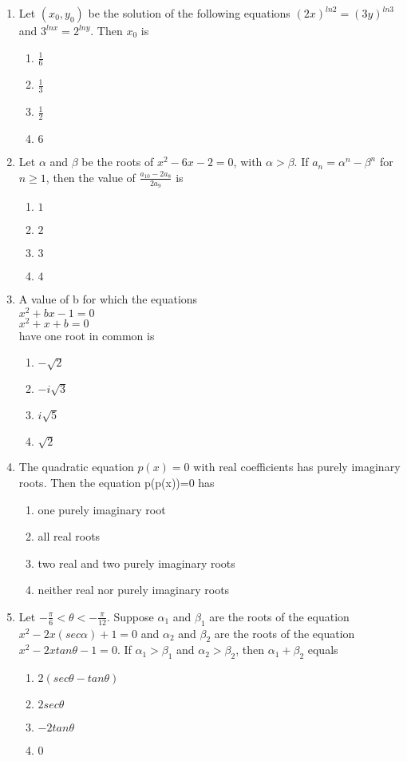 \documentclass[journal,12pt,twocolumn]{IEEEtran}
\begin{document}
\begin{enumerate}[label=\arabic*]
\item Let $(x_0,y_0)$ be the solution of the following equations $(2x)^{ln2}=(3y)^{ln3}$ and $3^{lnx}=2^{lny}$. Then $x_0$ is
\begin{enumerate}
\item $\frac{1}{6}$
\item $\frac{1}{3}$
\item $\frac{1}{2}$
\item $6$ 
\end{enumerate}

\item Let $\alpha$ and $\beta$ be the roots of $x^{2}-6x-2=0$, with $\alpha>\beta$. If $a_n=\alpha^{n}-\beta^{n}$ for $n\geq1$, then the value of $\frac{a_{10}-2a_{8}}{2a_{9}}$ is
\begin{enumerate}
\item $1$
\item $2$ 
\item $3$
\item $4$ 
\end{enumerate}

\item A value of b for which the equations\\
$x^{2}+bx-1=0$\\
$x^{2}+x+b=0$\\
have one root in common is 
\begin{enumerate}
\item $-\sqrt2$
\item $-i\sqrt3$ 
\item $i\sqrt5$
\item $\sqrt2$ 
\end{enumerate}

\item The quadratic equation $p(x)=0$ with real coefficients has purely imaginary roots. Then the equation p(p(x))=0 has
\begin{enumerate}
\item one purely imaginary root
\item all real roots
\item two real and two purely imaginary roots
\item neither real nor purely imaginary roots
\end{enumerate}

\item Let $-\frac{\pi}{6}<\theta<-\frac{\pi}{12}$. Suppose $\alpha_1$ and $\beta_1$ are the roots of the equation $x^{2}-2x (sec\alpha) +1=0$ and $\alpha_2$ and $\beta_2$ are the roots of the equation $x^{2}-2x tan\theta-1=0$. If $\alpha_1>\beta_1$ and $\alpha_2>\beta_2$, then $\alpha_1+\beta_2$ equals 
\begin{enumerate}
\item $2(sec\theta-tan\theta)$
\item $2sec\theta$ 
\item $-2tan\theta$
\item $0$ 
\end{enumerate}


\end{enumerate}
\end{document}
